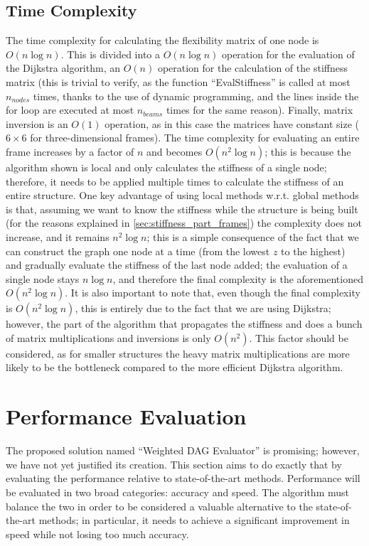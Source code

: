 \subsection{Time Complexity}

The time complexity for calculating the flexibility matrix of one node is $O(n \log{n})$.
This is divided into a $O(n \log{n})$ operation for the evaluation of the Dijkstra algorithm,
an $O(n)$ operation for the calculation of the stiffness matrix (this is trivial to verify, as 
the function ``EvalStiffness'' is called at most $n_{nodes}$ times, thanks to the use of dynamic programming,
and the lines inside the for loop are executed at most $n_{beams}$ times for the same reason).
Finally, matrix inversion is an $O(1)$ operation, as in this case the matrices have constant size ($6 \times 6$ for 
three-dimensional frames).
The time complexity for evaluating an entire frame increases by a factor of $n$ and becomes $O(n^2 \log{n})$; this is because the algorithm shown is local and only calculates the stiffness of a single node; therefore, it needs to be applied multiple times to calculate the stiffness of an entire structure.
One key advantage of using local methods w.r.t. global methods is that, assuming we want to know the 
stiffness while the structure is being built (for the reasons explained in \cref{sec:stiffness_part_frames})
the complexity does not increase, and it remains $n^2 \log{n}$; this is a simple consequence of the fact
that we can construct the graph one node at a time (from the lowest $z$ to the highest) and gradually
evaluate the stiffness of the last node added; the evaluation of a single node stays $n \log {n}$, and therefore
the final complexity is the aforementioned $O(n^2 \log{n})$. It is also important to note that, even though the 
final complexity is $O(n^2 \log{n})$, this is entirely due to the fact that we are using Dijkstra; however,
the part of the algorithm that propagates the stiffness and does a bunch of matrix multiplications and
inversions is only $O(n^2)$. This factor should be considered, as for smaller structures the heavy matrix multiplications
are more likely to be the bottleneck compared to the more efficient Dijkstra algorithm.

\section{Performance Evaluation}

The proposed solution named ``Weighted DAG Evaluator'' is promising; however, we have not yet justified its
creation. This section aims to do exactly that by evaluating the performance relative to state-of-the-art methods.
Performance will be evaluated in two broad categories: accuracy and speed. The algorithm must balance the two
in order to be considered a valuable alternative to the state-of-the-art methods; in particular, it needs to
achieve a significant improvement in speed while not losing too much accuracy.


